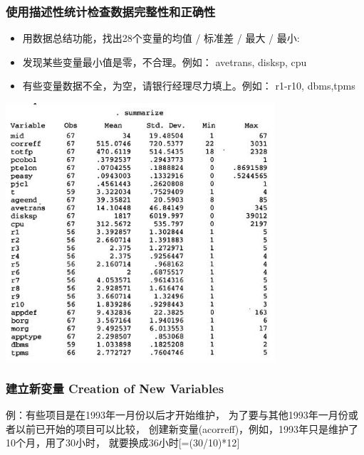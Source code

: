\hypertarget{ux4f7fux7528ux63cfux8ff0ux6027ux7edfux8ba1ux68c0ux67e5ux6570ux636eux5b8cux6574ux6027ux548cux6b63ux786eux6027}{%
\subsubsection{使用描述性统计检查数据完整性和正确性}\label{ux4f7fux7528ux63cfux8ff0ux6027ux7edfux8ba1ux68c0ux67e5ux6570ux636eux5b8cux6574ux6027ux548cux6b63ux786eux6027}}

\begin{itemize}
\tightlist
\item
  用数据总结功能，找出28个变量的均值 / 标准差 / 最大 / 最小:
\item
  发现某些变量最小值是零，不合理。例如： avetrans, disksp, cpu
\item
  有些变量数据不全，为空，请银行经理尽力填上。例如： r1-r10, dbms,tpms
\end{itemize}


\includegraphics[width=10cm]{maxwell_e51.jpg}

\hypertarget{creation-of-new-variablesux5efaux7acbux65b0ux53d8ux91cf}{%
\subsubsection{建立新变量 Creation of New
Variables}\label{creation-of-new-variablesux5efaux7acbux65b0ux53d8ux91cf}}

例：有些项目是在1993年一月份以后才开始维护，
为了要与其他1993年一月份或者以前已开始的项目可以比较，
创建新变量(acorreff)，例如，1993年只是维护了10个月，用了30小时，
就要换成36小时{[}=(30/10)*12{]}

